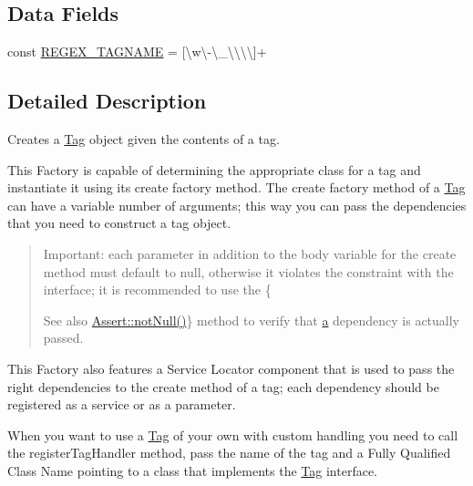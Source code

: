 \subsection*{Data Fields}
\begin{DoxyCompactItemize}
\item 
const \mbox{\hyperlink{classphp_documentor_1_1_reflection_1_1_doc_block_1_1_standard_tag_factory_a957784e7c5fa6aa8f0cfce8ded3c4a7a}{R\+E\+G\+E\+X\+\_\+\+T\+A\+G\+N\+A\+ME}} = \textquotesingle{}\mbox{[}\textbackslash{}w\textbackslash{}-\/\textbackslash{}\+\_\+\textbackslash{}\textbackslash{}\textbackslash{}\textbackslash{}\mbox{]}+\textquotesingle{}
\end{DoxyCompactItemize}


\subsection{Detailed Description}
Creates a \mbox{\hyperlink{interfacephp_documentor_1_1_reflection_1_1_doc_block_1_1_tag}{Tag}} object given the contents of a tag.

This Factory is capable of determining the appropriate class for a tag and instantiate it using its {\ttfamily create} factory method. The {\ttfamily create} factory method of a \mbox{\hyperlink{interfacephp_documentor_1_1_reflection_1_1_doc_block_1_1_tag}{Tag}} can have a variable number of arguments; this way you can pass the dependencies that you need to construct a tag object.

\begin{quote}
Important\+: each parameter in addition to the body variable for the {\ttfamily create} method must default to null, otherwise it violates the constraint with the interface; it is recommended to use the \{\begin{DoxySeeAlso}{See also}
\mbox{\hyperlink{class_webmozart_1_1_assert_1_1_assert_a9e3fc27f3f225919bd3c27bf3e88313c}{Assert\+::not\+Null()}}\} method to verify that \mbox{\hyperlink{interfacea}{a}} dependency is actually passed. 
\end{DoxySeeAlso}
\end{quote}


This Factory also features a Service Locator component that is used to pass the right dependencies to the {\ttfamily create} method of a tag; each dependency should be registered as a service or as a parameter.

When you want to use a \mbox{\hyperlink{interfacephp_documentor_1_1_reflection_1_1_doc_block_1_1_tag}{Tag}} of your own with custom handling you need to call the {\ttfamily register\+Tag\+Handler} method, pass the name of the tag and a Fully Qualified Class Name pointing to a class that implements the \mbox{\hyperlink{interfacephp_documentor_1_1_reflection_1_1_doc_block_1_1_tag}{Tag}} interface. 

